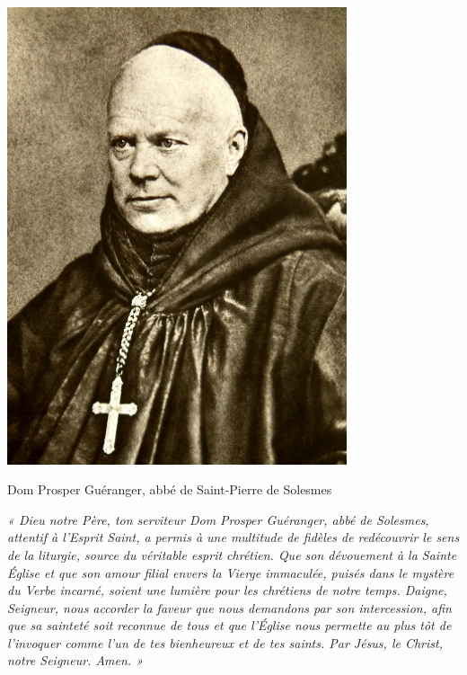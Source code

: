 \documentclass[10pt, twoside, french]{book}
\begin{document}
\newpage
\thispagestyle{empty}
\begin{center}
\includegraphics[width=10cm]{dom_gueranger.jpg}
\vspace{2mm}\par
Dom Prosper Guéranger, abbé de Saint-Pierre de Solesmes\par
\end{center}

\vfill

\emph{« Dieu notre Père, ton serviteur Dom Prosper Guéranger, abbé de Solesmes, attentif à l’Esprit Saint, a permis à une multitude de fidèles de redécouvrir le sens de la liturgie, source du véritable esprit chrétien. Que son dévouement à la Sainte Église et que son amour filial envers la Vierge immaculée, puisés dans le mystère du Verbe incarné, soient une lumière pour les chrétiens de notre temps. Daigne, Seigneur, nous accorder la faveur que nous demandons par son intercession, afin que sa sainteté soit reconnue de tous et que l’Église nous permette au plus tôt de l’invoquer comme l’un de tes bienheureux et de tes saints. Par Jésus, le Christ, notre Seigneur. Amen. »}

\newpage

\null

\newpage

\tableofcontents
\thispagestyle{empty}
\end{document}
